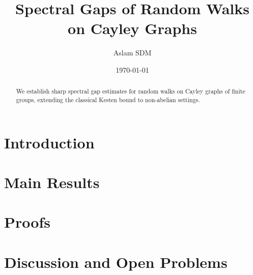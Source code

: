 \documentclass[11pt,a4paper]{article}
\title{Spectral Gaps of Random Walks on Cayley Graphs}
\author{Aslam SDM}
\date{\today}
\theoremstyle{remark}
\begin{document}
\maketitle

\begin{abstract}
We establish sharp spectral gap estimates for random walks on Cayley graphs of
finite groups, extending the classical Kesten bound to non-abelian settings.
\end{abstract}

\tableofcontents

\section{Introduction}
\label{sec:intro}


\section{Main Results}
\label{sec:main}


\section{Proofs}
\label{sec:proofs}


\section{Discussion and Open Problems}
\label{sec:discussion}




\end{document}
